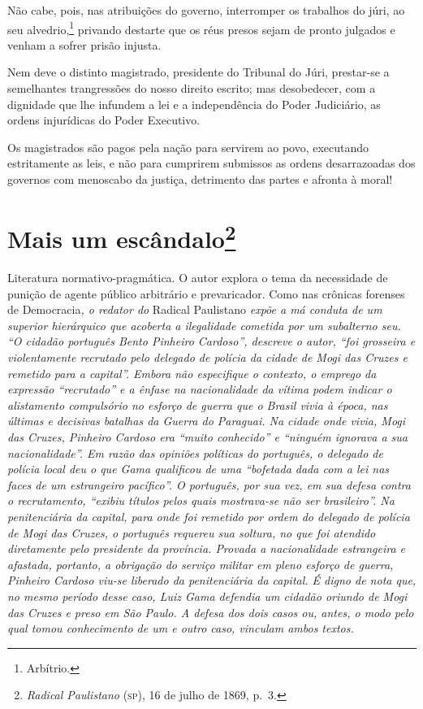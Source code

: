 Não cabe, pois, nas atribuições do governo, interromper os trabalhos do
júri, ao seu alvedrio,\footnote{Arbítrio.} privando destarte que os
réus presos sejam de pronto julgados e venham a sofrer prisão injusta.

Nem deve o distinto magistrado, presidente do Tribunal do Júri,
prestar-se a semelhantes trangressões do nosso direito escrito; mas
desobedecer, com a dignidade que lhe infundem a lei e a independência do
Poder Judiciário, as ordens injurídicas do Poder Executivo.

Os magistrados são pagos pela nação para servirem ao povo, executando
estritamente as leis, e não para cumprirem submissos as ordens
desarrazoadas dos governos com menoscabo da justiça, detrimento das
partes e afronta à moral!

\chapter{Mais um escândalo\footnote{\emph{Radical Paulistano} (\textsc{sp}),
  16 de julho de 1869, p.~3.}}

\begin{didascalia}
Literatura normativo-pragmática. O autor explora o tema da necessidade
de punição de agente público arbitrário e prevaricador. Como nas
crônicas forenses de Democracia\emph{, o redator do} Radical Paulistano
\emph{expõe a má conduta de um superior hierárquico que acoberta a
ilegalidade cometida por um subalterno seu. ``O cidadão português Bento
Pinheiro Cardoso'', descreve o autor, ``foi grosseira e violentamente
recrutado pelo delegado de polícia da cidade de Mogi das Cruzes e
remetido para a capital''. Embora não especifique o contexto, o emprego
da expressão ``recrutado'' e a ênfase na nacionalidade da vítima podem
indicar o alistamento compulsório no esforço de guerra que o Brasil
vivia à época, nas últimas e decisivas batalhas da Guerra do Paraguai.
Na cidade onde vivia, Mogi das Cruzes, Pinheiro Cardoso era ``muito
conhecido'' e ``ninguém ignorava a sua nacionalidade''. Em razão das
opiniões políticas do português, o delegado de polícia local deu o que
Gama qualificou de uma ``bofetada dada com a lei nas faces de um
estrangeiro pacífico''. O português, por sua vez, em sua defesa contra o
recrutamento, ``exibiu títulos pelos quais mostrava-se não ser
brasileiro''. Na penitenciária da capital, para onde foi remetido por
ordem do delegado de polícia de Mogi das Cruzes, o português requereu
sua soltura, no que foi atendido diretamente pelo presidente da
província. Provada a nacionalidade estrangeira e afastada, portanto, a
obrigação do serviço militar em pleno esforço de guerra, Pinheiro
Cardoso viu-se liberado da penitenciária da capital. É digno de nota
que, no mesmo período desse caso, Luiz Gama defendia um cidadão oriundo
de Mogi das Cruzes e preso em São Paulo. A defesa dos dois casos ou,
antes, o modo pelo qual tomou conhecimento de um e outro caso, vinculam
ambos textos.}
\end{didascalia}



